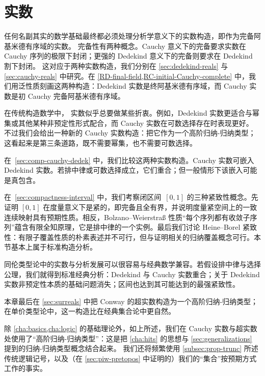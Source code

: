 \chapter{实数}
\label{cha:real-numbers}

%
任何名副其实的数学基础最终都必须处理分析学意义下的实数构造，即作为完备阿基米德有序域的实数。
%
完备性有两种概念。Cauchy 意义下的完备要求实数在 Cauchy 序列的极限下封闭；更强的 Dedekind 意义下的完备则要求在 Dedekind 割下封闭。
这对应于两种实数构造，我们分别在 \cref{sec:dedekind-reals} 与 \cref{sec:cauchy-reals} 中研究。在 \cref{RD-final-field,RC-initial-Cauchy-complete} 中，我们用泛性质刻画这两种构造：Dedekind 实数是终阿基米德有序域，而 Cauchy 实数是初 Cauchy 完备阿基米德有序域。

在传统构造数学中，
%
实数似乎总要做某些折衷。例如，Dedekind 实数更适合与幂集或其他某种非预定性形式配合，而 Cauchy 实数在可数选择存在时表现更好。
%
不过我们会给出一种新的 Cauchy 实数构造：把它作为一个高阶归纳-归纳类型；这看起来是第三条道路，既不需要幂集，也不需要可数选择。

在~\cref{sec:comp-cauchy-dedek} 中，我们比较这两种实数构造。Cauchy 实数可嵌入 Dedekind 实数。若排中律或可数选择成立，它们重合；但一般情形下该嵌入可能是真包含。

在~\cref{sec:compactness-interval} 中，我们考察闭区间~$[0,1]$ 的三种紧致性概念。先证明 $[0,1]$ 在度量意义下是紧的，即完备且全有界，并说明度量紧空间上的一致连续映射具有预期性质。相反，Bolzano--Weierstra\ss{} 性质“每个序列都有收敛子序列”蕴含有限全知原理，它是排中律的一个实例。最后我们讨论 Heine--Borel 紧致性：有限子覆盖性质的朴素表述并不可行，但与证明相关的归纳覆盖概念可行。本节基本上属于标准构造分析。

同伦类型论中的实数与分析发展可以很容易与经典数学兼容。若假设排中律与选择公理，我们就得到标准经典分析：Dedekind 与 Cauchy 实数重合；关于 Dedekind 实数非预定性本质的基础问题消失；区间也达到其可能达到的最强紧致性。

本章最后在 \cref{sec:surreals} 中把 Conway 的超实数构造为一个高阶归纳-归纳类型；
在单价类型论中，这一构造比在经典集合论中更自然。

除 \cref{cha:basics,cha:logic} 的基础理论外，如上所述，我们在 Cauchy 实数与超实数处使用了“高阶归纳-归纳类型”：这是把 \cref{cha:hits} 的思想与 \cref{sec:generalizations} 提到的归纳-归纳类型概念结合起来。
我们还将频繁使用 \cref{subsec:prop-trunc} 所述传统逻辑记号，以及（在 \cref{sec:piw-pretopos} 中证明的）我们的“集合”按预期方式工作的事实。

